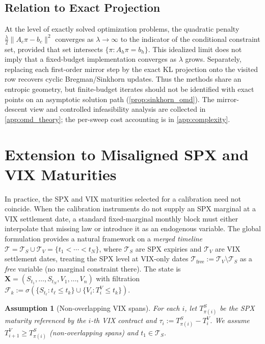 \documentclass{article}
\newtheorem{assumption}[theorem]{Assumption}
\newcommand{\cF}{\mathcal{F}}
\begin{document}
\subsection{Relation to Exact Projection}\label{subsec:unification}

At the level of exactly solved optimization problems, the quadratic penalty
$\tfrac{\lambda}{2}\lVert A_c\pi-b_c\rVert^2$ converges as $\lambda\to\infty$ to the indicator of the conditional constraint set, provided that set intersects $\{\pi:A_h\pi=b_h\}$.
This idealized limit does not imply that a fixed-budget implementation converges as $\lambda$ grows.
Separately, replacing each first-order mirror step by the exact KL projection onto the visited row recovers cyclic Bregman/Sinkhorn updates.
Thus the methods share an entropic geometry, but finite-budget iterates should not be identified with exact points on an asymptotic solution path (\cref{prop:sinkhorn_omd}).
The mirror-descent view and controlled infeasibility analysis are collected in \cref{app:omd_theory}; the per-sweep cost accounting is in \cref{app:complexity}.

\section{Extension to Misaligned SPX and VIX Maturities}\label{sec:misaligned}

In practice, the SPX and VIX maturities selected for a calibration need not coincide.
When the calibration instruments do not supply an SPX marginal at a VIX settlement date, a standard fixed-marginal monthly block must either interpolate that missing law or introduce it as an endogenous variable.
The global formulation provides a natural framework on a \emph{merged timeline} $\mathcal{T} = \mathcal{T}_S \cup \mathcal{T}_V = \{t_1 < \cdots < t_N\}$, where $\mathcal{T}_S$ are SPX expiries and $\mathcal{T}_V$ are VIX settlement dates, treating the SPX level at VIX-only dates $\mathcal{T}_{\mathrm{free}} := \mathcal{T}_V \setminus \mathcal{T}_S$ as a \emph{free} variable (no marginal constraint there).
The state is $\mathbf{X} = (S_{t_1}, \ldots, S_{t_N}, V_1, \ldots, V_n)$ with filtration $\cF_k := \sigma(\{S_{t_\ell} : t_\ell \leq t_k\} \cup \{V_i :
T_i^V \leq t_k\})$.

\begin{assumption}[Non-overlapping VIX spans]\label{ass:non_overlap}
For each $i$, let $T_{\pi(i)}^S$ be the SPX maturity referenced by the $i$-th VIX contract and $\tau_i := T_{\pi(i)}^S - T_i^V$.
We assume $T_{i+1}^V \geq T_{\pi(i)}^S$ (non-overlapping spans) and $t_1 \in \mathcal{T}_S$.
\end{assumption}
\end{document}
